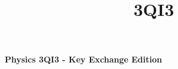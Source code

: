 \documentclass[letterpaper, 8pt]{extarticle}
\title{3QI3}
\begin{document}
\raggedright
\tiny


\begin{center}
    {\textbf{Physics 3QI3 - Key Exchange Edition}} \\
\end{center}
\setlength{\premulticols}{1pt}
\setlength{\postmulticols}{1pt}
\setlength{\multicolsep}{1pt}
\setlength{\columnsep}{2pt}
\end{document}
